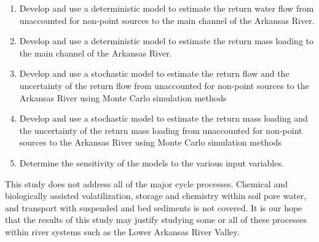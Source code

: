 \begin{linenumbers}[1]
\begin{enumerate}
	\item Develop and use a deterministic model to estimate the return water flow from unaccounted for non-point sources to the main channel of the Arkansas River.
	\item Develop and use a deterministic model to estimate the return \Se mass loading to the main channel of the Arkansas River.
	\item Develop and use a stochastic model to estimate the return flow and the uncertainty of the return flow from unaccounted for non-point sources to the Arkansas River using Monte Carlo simulation methods
	\item Develop and use a stochastic model to estimate the return \Se mass loading and the uncertainty of the return \Se mass loading from unaccounted for non-point sources to the Arkansas River using Monte Carlo simulation methods
	\item Determine the sensitivity of the models to the various input variables.
\end{enumerate}

This study does not address all of the major \Se cycle processes.  Chemical and biologically assisted \Se volatilization, \Se storage and chemistry within soil pore water, and \Se transport with suspended and bed sediments is not covered.  It is our hope that the results of this study may justify studying some or all of these processes within river systems such as the Lower Arkansas River Valley.

\end{linenumbers}
\clearpage{}